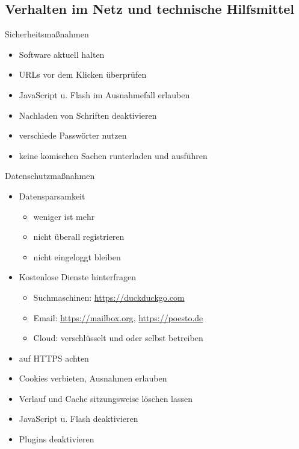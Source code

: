 \documentclass[hyperref={colorlinks,linkcolor=white}, utf8]{beamer}
\begin{document}
	\subsection{Verhalten im Netz und technische Hilfsmittel}
	\begin{frame}{Sicherheitsmaßnahmen}
		\begin{itemize}
			\item Software aktuell halten
			\item URLs vor dem Klicken überprüfen
			\item JavaScript u. Flash im Ausnahmefall erlauben
			\item Nachladen von Schriften deaktivieren
			\item verschiede Passwörter nutzen
			\item keine komischen Sachen runterladen und ausführen
		\end{itemize}
	\end{frame}
	
	\begin{frame}{Datenschutzmaßnahmen}
		\begin{itemize}
			\item Datensparsamkeit
			\begin{itemize}
				\item weniger ist mehr
				\item nicht überall registrieren
				\item nicht eingeloggt bleiben
			\end{itemize}
			\item Kostenlose Dienste hinterfragen
			\begin{itemize}
				\item Suchmaschinen: \url{https://duckduckgo.com}
				\item Email: \url{https://mailbox.org}, \url{https://poesto.de}
				\item Cloud: verschlüsselt und oder selbst betreiben
			\end{itemize}
			\item auf HTTPS achten
			\item Cookies verbieten, Ausnahmen erlauben
			\item Verlauf und Cache sitzungsweise löschen lassen
			\item JavaScript u. Flash deaktivieren
			\item Plugins deaktivieren
		\end{itemize}
	\end{frame}
	
\end{document}
